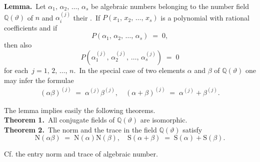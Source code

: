 \documentclass[12pt]{article}
\theoremstyle{definition}
\begin{document}
\textbf{Lemma.}\, Let $\alpha_1,\,\alpha_2,\,\ldots,\,\alpha_s$ be algebraic numbers belonging to the number field 
$\mathbb{Q}(\vartheta)$ of  $n$ and $\alpha_i^{(j)}$ their .\, If 
$P(x_1,\,x_2,\,\ldots,\,x_s)$ is a polynomial with rational coefficients and if
$$P(\alpha_1,\,\alpha_2,\,\ldots,\,\alpha_s) \;=\; 0,$$
then also
$$P(\alpha_1^{(j)},\,\alpha_2^{(j)},\,\ldots,\,\alpha_s^{(j)}) \;=\; 0$$
for each\, $j = 1,\,2,\,\ldots,\,n$.\, In the special case of two elements $\alpha$ and $\beta$ of 
$\mathbb{Q}(\vartheta)$ one may infer the formulae
\begin{align}
(\alpha\beta)^{(j)} \;=\; \alpha^{(j)}\beta^{(j)}, \quad (\alpha\!+\!\beta)^{(j)} \;=\; \alpha^{(j)}\!+\!\beta^{(j)}.
\end{align}


The lemma implies easily the following theorems.\\

\textbf{Theorem 1.}\, All conjugate fields of $\mathbb{Q}(\vartheta)$ are isomorphic.\\


\textbf{Theorem 2.}\, The norm and the trace in the field $\mathbb{Q}(\vartheta)$ satisfy
$$\mbox{N}(\alpha\beta) \;=\; \mbox{N}(\alpha)\mbox{N}(\beta), \quad 
\mbox{S}(\alpha\!+\!\beta) \;=\; \mbox{S}(\alpha)\!+\!\mbox{S}(\beta).$$

Cf. the entry norm and trace of algebraic number.



\end{document}
